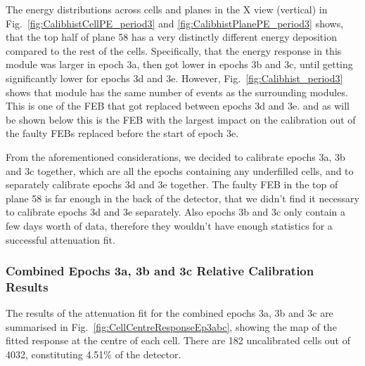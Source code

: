 The energy distributions across cells and planes in the X view (vertical) in Fig.~\ref{fig:CalibhistCellPE_period3} and \ref{fig:CalibhistPlanePE_period3} shows, that the top half of plane 58 has a very distinctly different energy deposition compared to the rest of the cells. Specifically, that the energy response in this module was larger in epoch 3a, then got lower in epochs 3b and 3c, until getting significantly lower for epochs 3d and 3e. However, Fig.~\ref{fig:Calibhist_period3} shows that module has the same number of events as the surrounding modules. This is one of the \gls{FEB} that got replaced between epochs 3d and 3e. and as will be shown below this is the \gls{FEB} with the largest impact on the calibration out of the faulty \gls{FEB}s replaced before the start of epoch 3e.

From the aforementioned considerations, we decided to calibrate epochs 3a, 3b and 3c together, which are all the epochs containing any underfilled cells, and to separately calibrate epochs 3d and 3e together. The faulty \gls{FEB} in the top of plane 58 is far enough in the back of the detector, that we didn't find it necessary to calibrate epochs 3d and 3e separately. Also epochs 3b and 3c only contain a few days worth of data, therefore they wouldn't have enough statistics for a successful attenuation fit.

\subsubsection*{Combined Epochs 3a, 3b and 3c Relative Calibration Results}

The results of the attenuation fit for the combined epochs 3a, 3b and 3c are summarised in Fig.~\ref{fig:CellCentreResponseEp3abc}, showing the map of the fitted response at the centre of each cell. There are 182 uncalibrated cells out of 4032, constituting 4.51\% of the detector.

